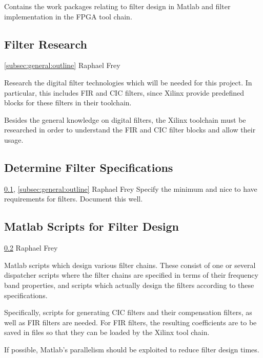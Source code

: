 \documentclass[a4paper,oneside]{alpenspecs/alpenspecs}
\begin{document}
Contains the  work packages  relating to  filter design  in Matlab  and filter
implementation in the FPGA tool chain.

\subsection{Filter Research}
\label{subsec:filter:research}

\wpac
    {}
    {}
    {}
    {\ref{subsec:general:outline}}
    {}
    {Raphael Frey}
    {%
        Research the digital filter technologies which will be needed for this
        project. In particular, this includes FIR and CIC filters, since Xilinx
        provide predefined blocks for these filters in their toolchain.

        Besides the general knowledge on digital filters, the Xilinx toolchain
        must be researched in order to understand the FIR and CIC filter blocks
        and allow their usage.
    }

\subsection{Determine Filter Specifications}
\label{subsec:filter:specification}

\wpac
    {}
    {}
    {}
    {\ref{subsec:filter:research}, \ref{subsec:general:outline}}
    {}
    {Raphael Frey}
    {%
        Specify the minimum and nice to have requirements for filters.
        Document this well.
    }

\subsection{Matlab Scripts for Filter Design}
\label{subsec:filter:matlab}

\wpac
    {}
    {}
    {}
    {\ref{subsec:filter:specification}}
    {}
    {Raphael Frey}
    {%
        Matlab scripts  which design  various filter chains. These  consist of
        one  or  several  dispatcher  scripts  where  the  filter  chains  are
        specified in  terms of  their frequency  band properties,  and scripts
        which actually design the filters according to these specifications.

        Specifically,   scripts  for   generating   CIC   filters  and   their
        compensation  filters, as  well  as FIR  filters  are needed. For  FIR
        filters, the resulting  coefficients are to be saved in  files so that
        they can be loaded by the Xilinx tool chain.

        If possible, Matlab's parallelism should be exploited to reduce filter
        design times.
    }
\end{document}
